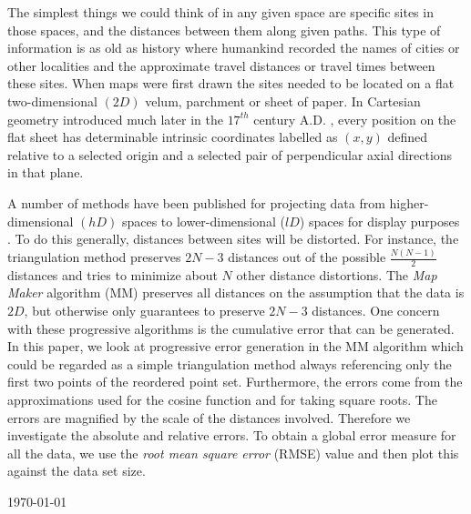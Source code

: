 \documentclass[10pt,a4paper]{article}
\begin{document}
	\pagestyle{empty}


	The simplest things we could think of in any given space are specific sites in those spaces, and the distances between them along given paths. This type of information is as old as history where humankind recorded the names of cities or other localities and the approximate travel distances or travel times between these sites. When maps were first drawn the sites needed to be located on a flat two-dimensional $(2D)$ velum, parchment or sheet of paper. In Cartesian geometry introduced much later in the \textnormal{$17^{th}$} century A.D. \cite{AF95}, every position on the flat sheet has determinable intrinsic coordinates labelled as $(x, y)$ defined relative to a selected origin and a selected pair of perpendicular axial directions in that plane.

	A number of methods have been published for projecting data from higher-dimensional $(hD)$ spaces to lower-dimensional ($lD$) spaces for display purposes \cite{GS}. To do this generally, distances between sites will be distorted. For instance, the triangulation method \cite{Alu96x,BBF92} preserves $2N - 3$ distances out of the possible $\frac{N(N - 1)}{2}$ distances and tries to minimize about $N$ other distance distortions. The \emph{Map Maker} algorithm (MM) \cite{Dax} preserves all distances on the assumption that the data is $2D$, but otherwise only guarantees to preserve $2N - 3$ distances. One concern with these progressive algorithms is the cumulative error that can be generated. In this paper, we look at progressive error generation in the MM algorithm which could be regarded as a simple triangulation method always referencing only the first two points of the reordered point set. Furthermore, the errors come from the approximations used for the cosine function and for taking square roots. The errors are magnified by the scale of the distances involved. Therefore we investigate the absolute and relative errors. To obtain a global error measure for all the data, we use the \emph{root mean square error} (RMSE) value and then plot this against the data set size.
	
	\hfill \today 

	
\end{document}
